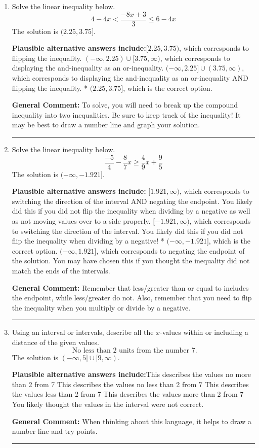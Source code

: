 \documentclass{extbook}[14pt]
\newcommand{\litem}[1]{\item #1

\rule{\textwidth}{0.4pt}}
\begin{document}
\begin{enumerate}
{\textbf{General Comment:} When multiplying or dividing by a negative, flip the sign.
}
\litem{
Solve the linear inequality below.
\[ 4 - 4 x < \frac{-8 x + 3}{3} \leq 6 - 4 x \]The solution is \( (2.25, 3.75] \).\begin{enumerate}[label=\Alph*.]
\textbf{Plausible alternative answers include:}$[2.25, 3.75)$, which corresponds to flipping the inequality.
$(-\infty, 2.25) \cup [3.75, \infty)$, which corresponds to displaying the and-inequality as an or-inequality.
$(-\infty, 2.25] \cup (3.75, \infty)$, which corresponds to displaying the and-inequality as an or-inequality AND flipping the inequality.
* $(2.25, 3.75]$, which is the correct option.

\end{enumerate}

\textbf{General Comment:} To solve, you will need to break up the compound inequality into two inequalities. Be sure to keep track of the inequality! It may be best to draw a number line and graph your solution.
}
\litem{
Solve the linear inequality below.
\[ \frac{-5}{4} - \frac{8}{7} x \geq \frac{4}{9} x + \frac{9}{5} \]The solution is \( (-\infty, -1.921] \).\begin{enumerate}[label=\Alph*.]
\textbf{Plausible alternative answers include:} $[1.921, \infty)$, which corresponds to switching the direction of the interval AND negating the endpoint. You likely did this if you did not flip the inequality when dividing by a negative as well as not moving values over to a side properly.
 $[-1.921, \infty)$, which corresponds to switching the direction of the interval. You likely did this if you did not flip the inequality when dividing by a negative!
* $(-\infty, -1.921]$, which is the correct option.
 $(-\infty, 1.921]$, which corresponds to negating the endpoint of the solution.
You may have chosen this if you thought the inequality did not match the ends of the intervals.
\end{enumerate}

\textbf{General Comment:} Remember that less/greater than or equal to includes the endpoint, while less/greater do not. Also, remember that you need to flip the inequality when you multiply or divide by a negative.
}
\litem{
Using an interval or intervals, describe all the $x$-values within or including a distance of the given values.
\[ \text{ No less than } 2 \text{ units from the number } 7. \]The solution is \( (-\infty, 5] \cup [9, \infty) \).\begin{enumerate}[label=\Alph*.]
\textbf{Plausible alternative answers include:}This describes the values no more than 2 from 7
This describes the values no less than 2 from 7
This describes the values less than 2 from 7
This describes the values more than 2 from 7
You likely thought the values in the interval were not correct.
\end{enumerate}

\textbf{General Comment:} When thinking about this language, it helps to draw a number line and try points.
}
\end{enumerate}
\end{document}
